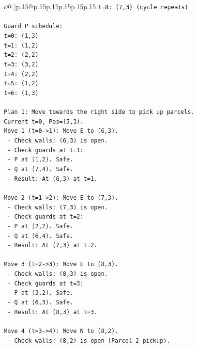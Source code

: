\documentclass{article}
\begin{document}
{\begin{supertabular}{c@{$\;$}|p{.15\linewidth}@{}p{.15\linewidth}p{.15\linewidth}p{.15\linewidth}p{.15\linewidth}p{.15\linewidth}}
{{{\texttt{t=8: (7,3) (cycle repeats)} \\
\\ 
\texttt{Guard P schedule:} \\
\texttt{t=0: (1,3)} \\
\texttt{t=1: (1,2)} \\
\texttt{t=2: (2,2)} \\
\texttt{t=3: (3,2)} \\
\texttt{t=4: (2,2)} \\
\texttt{t=5: (1,2)} \\
\texttt{t=6: (1,3)} \\
\\ 
\texttt{Plan 1: Move towards the right side to pick up parcels.} \\
\texttt{Current t=0, Pos=(5,3).} \\
\texttt{Move 1 (t=0{-}>1): Move E to (6,3).} \\
\texttt{  {-} Check walls: (6,3) is open.} \\
\texttt{  {-} Check guards at t=1:} \\
\texttt{    {-} P at (1,2). Safe.} \\
\texttt{    {-} Q at (7,4). Safe.} \\
\texttt{  {-} Result: At (6,3) at t=1.} \\
\\ 
\texttt{Move 2 (t=1{-}>2): Move E to (7,3).} \\
\texttt{  {-} Check walls: (7,3) is open.} \\
\texttt{  {-} Check guards at t=2:} \\
\texttt{    {-} P at (2,2). Safe.} \\
\texttt{    {-} Q at (6,4). Safe.} \\
\texttt{  {-} Result: At (7,3) at t=2.} \\
\\ 
\texttt{Move 3 (t=2{-}>3): Move E to (8,3).} \\
\texttt{  {-} Check walls: (8,3) is open.} \\
\texttt{  {-} Check guards at t=3:} \\
\texttt{    {-} P at (3,2). Safe.} \\
\texttt{    {-} Q at (6,3). Safe.} \\
\texttt{  {-} Result: At (8,3) at t=3.} \\
\\ 
\texttt{Move 4 (t=3{-}>4): Move N to (8,2).} \\
\texttt{  {-} Check walls: (8,2) is open (Parcel 2 pickup).} \\
}}}
\end{supertabular}}
\end{document}
